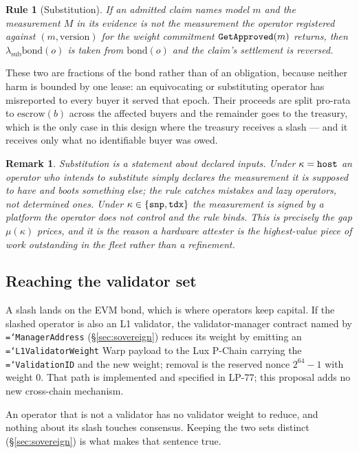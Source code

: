 \documentclass[11pt,a4paper]{article}
\newtheorem{norm}[definition]{Rule}
\newtheorem{remark}[definition]{Remark}
\newcommand{\code}[1]{\texttt{\hyphenchar\font=`\-\relax #1}}
\newcommand{\bond}{\mathrm{bond}}
\newcommand{\esc}{\mathrm{escrow}}
\begin{document}
\begin{norm}[Substitution]
If an admitted claim names model $m$ and the measurement $M$ in its evidence is
not the measurement the operator registered against $(m, \text{version})$ for the
weight commitment $\code{GetApproved}(m)$ returns, then
$\lambda_{\mathrm{sub}} \bond(o)$ is taken from $\bond(o)$ and the claim's
settlement is reversed.
\end{norm}

These two are fractions of the bond rather than of an obligation, because
neither harm is bounded by one lease: an equivocating or substituting operator
has misreported to every buyer it served that epoch. Their proceeds are split
pro-rata to $\esc(b)$ across the affected buyers and the remainder goes to the
treasury, which is the only case in this design where the treasury receives a
slash --- and it receives only what no identifiable buyer was owed.

\begin{remark}
Substitution is a statement about \emph{declared} inputs. Under
$\kappa = \code{host}$ an operator who intends to substitute simply declares the
measurement it is supposed to have and boots something else; the rule catches
mistakes and lazy operators, not determined ones. Under
$\kappa \in \{\code{snp},\code{tdx}\}$ the measurement is signed by a platform
the operator does not control and the rule binds. This is precisely the gap
$\mu(\kappa)$ prices, and it is the reason a hardware attester is the highest-value
piece of work outstanding in the fleet rather than a refinement.
\end{remark}

\subsection{Reaching the validator set}

A slash lands on the EVM bond, which is where operators keep capital. If the
slashed operator is also an L1 validator, the validator-manager contract named by
\code{ManagerAddress} (§\ref{sec:sovereign}) reduces its weight by emitting an
\code{L1ValidatorWeight} Warp payload to the Lux P-Chain carrying the
\code{ValidationID} and the new weight; removal is the reserved nonce
$2^{64}-1$ with weight $0$. That path is implemented and specified in LP-77; this
proposal adds no new cross-chain mechanism.

An operator that is not a validator has no validator weight to reduce, and
nothing about its slash touches consensus. Keeping the two sets distinct
(§\ref{sec:sovereign}) is what makes that sentence true.
\end{document}

